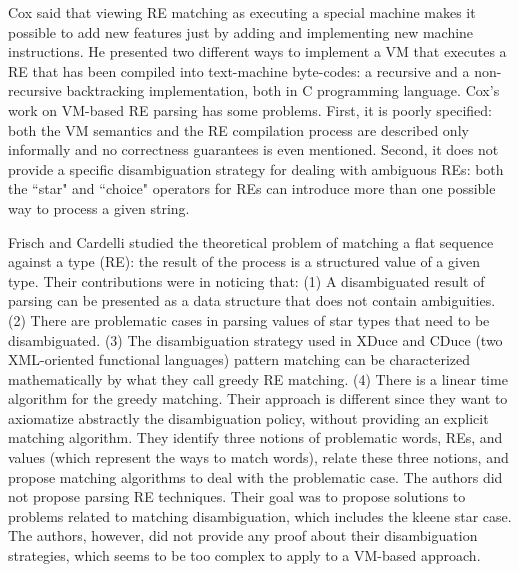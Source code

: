 \documentclass[oneside,12pt]{scrbook}
\theoremstyle{definition}
\theoremstyle{plain}
\theoremstyle{definition}
\begin{document}
Cox \cite{Cox2009} said that viewing RE matching as executing a special machine makes it possible to add new features just by adding and implementing new machine instructions. He presented two different ways to implement a VM that executes a RE that has been compiled into text-machine byte-codes: a recursive and a non-recursive backtracking implementation, both in C programming language. Cox’s work on VM-based RE parsing has some problems. First, it is poorly specified: both the VM semantics and the RE compilation process are described only informally and no correctness guarantees is even mentioned. Second, it does not provide a specific disambiguation strategy for dealing with ambiguous REs: both the ``star" and ``choice" operators for REs can introduce more than one possible way to process a given string.


Frisch and Cardelli \cite{Frisch2004} studied the theoretical problem of matching a flat sequence against a type (RE): the
result of the process is a structured value of a given type. Their contributions were in noticing that: (1) A disambiguated result of parsing can be presented as a data structure that does not contain ambiguities. (2) There are problematic cases in parsing values of star types that need to be disambiguated. (3) The disambiguation strategy used in XDuce and CDuce (two XML-oriented functional languages) pattern matching can be characterized mathematically by what they call greedy RE matching. (4) There is a linear time algorithm for the greedy matching. Their approach is different since they want to axiomatize abstractly the disambiguation policy, without providing an explicit matching algorithm. They identify three notions of problematic words, REs, and values (which represent the ways to match words), relate these three notions, and propose matching algorithms to deal with the problematic case. The authors did not propose parsing RE techniques. Their goal was to propose solutions to problems related to matching disambiguation, which includes the kleene star case. The authors, however, did not provide any proof about their disambiguation strategies, which seems to be too complex to apply to a VM-based approach.

\end{document}
